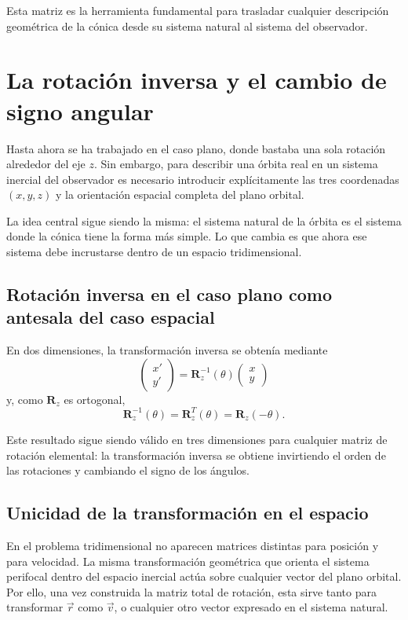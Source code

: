 Esta matriz es la herramienta fundamental para trasladar cualquier descripción geométrica de la cónica desde su sistema natural al sistema del observador.

\section{La rotación inversa y el cambio de signo angular}
Hasta ahora se ha trabajado en el caso plano, donde bastaba una sola rotación alrededor del eje \(z\). Sin embargo, para describir una órbita real en un sistema inercial del observador es necesario introducir explícitamente las tres coordenadas \((x,y,z)\) y la orientación espacial completa del plano orbital.

La idea central sigue siendo la misma: el sistema natural de la órbita es el sistema donde la cónica tiene la forma más simple. Lo que cambia es que ahora ese sistema debe incrustarse dentro de un espacio tridimensional.

\subsection{Rotación inversa en el caso plano como antesala del caso espacial}
En dos dimensiones, la transformación inversa se obtenía mediante
\[
\begin{pmatrix} x' \\ y' \end{pmatrix} = \mathbf{R}_z^{-1}(\theta)\begin{pmatrix} x \\ y \end{pmatrix}
\]
y, como \(\mathbf{R}_z\) es ortogonal,
\[
\mathbf{R}_z^{-1}(\theta) = \mathbf{R}_z^T(\theta) = \mathbf{R}_z(-\theta).
\]

Este resultado sigue siendo válido en tres dimensiones para cualquier matriz de rotación elemental: la transformación inversa se obtiene invirtiendo el orden de las rotaciones y cambiando el signo de los ángulos.

\subsection{Unicidad de la transformación en el espacio}
En el problema tridimensional no aparecen matrices distintas para posición y para velocidad. La misma transformación geométrica que orienta el sistema perifocal dentro del espacio inercial actúa sobre cualquier vector del plano orbital. Por ello, una vez construida la matriz total de rotación, esta sirve tanto para transformar \(\vec{r}\) como \(\vec{v}\), o cualquier otro vector expresado en el sistema natural.

